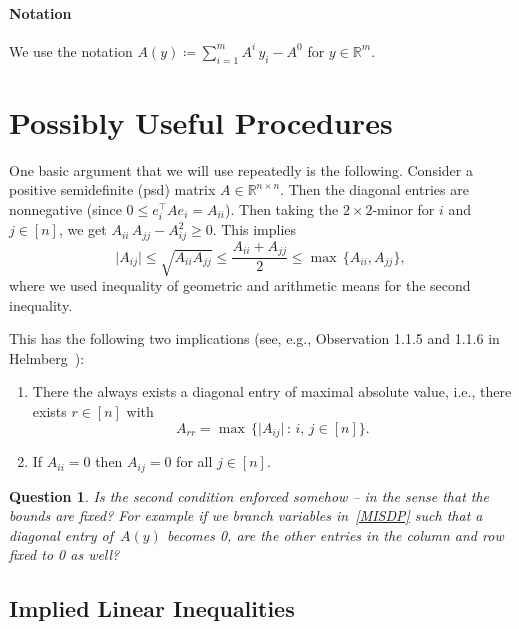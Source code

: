 \documentclass[10pt, a4paper]{article}
\newcommand{\suchthat}{\,:\,}
\newcommand{\abs}[1]{\lvert{#1}\rvert}
\newcommand{\define}{\coloneqq}
\newcommand{\T}{^{\top}}
\newcommand{\R}{\mathds{R}}
\newtheorem{question}[theorem]{Question}
\begin{document}
\paragraph{Notation}

We use the notation $A(y) \define \sum_{i=1}^m A^i\, y_i - A^0$ for $y \in \R^m$.


\section{Possibly Useful Procedures}

One basic argument that we will use repeatedly is the following. Consider a
positive semidefinite (psd) matrix $A \in \R^{n \times n}$. Then the
diagonal entries are nonnegative (since $0 \leq e_i\T A e_i =
A_{ii}$). Then taking the $2 \times 2$-minor for $i$ and $j \in [n]$, we
get $A_{ii}\, A_{jj} - A_{ij}^2 \geq 0$. This implies
\begin{equation}\label{eq:TwoByTwoMinorInequality}
  \abs{A_{ij}} \leq \sqrt{A_{ii} A_{jj}} \leq \frac{A_{ii} + A_{jj}}{2} \leq \max\,\{A_{ii},
  A_{jj}\},
\end{equation}
where we used inequality of geometric and arithmetic means for the second inequality.

This has the following two implications (see, e.g., Observation 1.1.5 and
1.1.6 in Helmberg~\cite{Hel00}):
\begin{enumerate}
\item There the always exists a diagonal entry of maximal absolute value,
  i.e., there exists $r \in [n]$ with
  \[
    A_{rr} = \max\, \{\abs{A_{ij}} \suchthat i,\,j \in [n]\}.
  \]
\item If $A_{ii} = 0$ then $A_{ij} = 0$ for all $j \in [n]$.
\end{enumerate}

\begin{question}
  Is the second condition enforced somehow -- in the sense that the bounds
  are fixed? For example if we branch variables in~\eqref{MISDP} such that
  a diagonal entry of~$A(y)$ becomes 0, are the other entries in the column and row
  fixed to 0 as well?
\end{question}


\subsection{Implied Linear Inequalities}\label{sec:ImpliedLinEqs}
\end{document}
